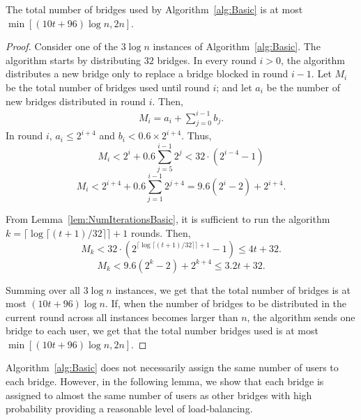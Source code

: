 \documentclass{llncs}
\newcommand{\jared}[1]{}
\newcommand{\sfsize}{\fontsize{0.73\baselineskip}{0.73\baselineskip}\selectfont}
\newcommand{\sans}[1]{\textsf{\sfsize \mbox{#1}}}
\newcommand{\sansb}[1]{\textbf{\sans{\mbox{#1}}}}
\begin{document}
\begin{lemma}[\sansb{Bridge Cost}] \label{lem:NumBridgesBasic}
	The total number of bridges used by Algorithm~\ref{alg:Basic} is at most $\min\left[{(10t + 96)\log{n}}, 2n\right]$. %
\end{lemma}
\begin{proof}
	Consider one of the $3\log{n}$ instances of Algorithm~\ref{alg:Basic}. The algorithm starts by distributing  $32$ bridges. In every round ${i > 0}$, the algorithm distributes a new bridge only to replace a bridge blocked in round ${i-1}$. Let $M_i$ be the total number of bridges used until round $i$; and let $a_i$ be the number of new bridges distributed in round $i$.  Then, 
	\begin{align}
	M_i = a_i + \sum_{j=0}^{i-1} b_j. \label{eq:NumBridges}
	\end{align}
	In round $i$, ${a_i \leq 2^{i+4}}$ and ${b_i < 0.6 \times 2^{i+4}}$.  Thus,
	\[M_i < 2^i + 0.6\sum_{j=5}^{i-1} 2^j < 32\cdot(2^{i-4} - 1)\]
	\[M_i < 2^{i+4} + 0.6\sum_{j=1}^{i-1} 2^{j+4} = 9.6(2^i - 2) + 2^{i+4}.\]
	
	From Lemma~\ref{lem:NumIterationsBasic}, it is sufficient to run the algorithm ${k = \lceil \log{\lceil (t+1)/32 \rceil} \rceil + 1}$ rounds. Then,	
	\[M_k < 32\cdot(2^{\lceil \log{\lceil (t+1)/32 \rceil} \rceil + 1} - 1) \leq 4t + 32.\]
	\[M_k < 9.6(2^k - 2) + 2^{k+4} \leq 3.2t + 32.\]
	
Summing over all $3 \log{n}$ instances, we get that the total number of bridges is at most $(10t + 96)\log{n}$. If, when the number of bridges to be distributed in the current round across all instances becomes larger than $n$, the algorithm sends one bridge to each user, we get that the total number bridges used is at most $\min\left[{(10t + 96)\log{n}}, 2n\right]$. %
\end{proof}

\jared{I'm moving this to the end, since it doesn't directly connect to the main theorem.}
Algorithm~\ref{alg:Basic} does not necessarily assign the same number of users to each bridge. However, in the following lemma, we show that each bridge is assigned to almost the same number of users as other bridges with high probability providing a reasonable level of load-balancing.

\end{document}
